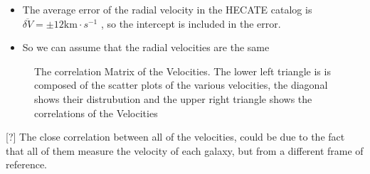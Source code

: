 \documentclass[
]{article}
\providecommand{\tightlist}{%
  \setlength{\itemsep}{0pt}\setlength{\parskip}{0pt}}\usepackage{longtable,booktabs,array}
\begin{document}
\begin{itemize}
\tightlist
\item
  The average error of the radial velocity in the HECATE catalog is
  \(\overline{\delta V} = \pm 12\text{km}\cdot s^{-1}\) , so the
  intercept is included in the error.
\item
  So we can assume that the radial velocities are the same
\end{itemize}

\begin{figure}


\caption{\label{fig-vel-pairplot}The correlation Matrix of the
Velocities. The lower left triangle is is composed of the scatter plots
of the various velocities, the diagonal shows their distrubution and the
upper right triangle shows the correlations of the Velocities}

\end{figure}%

{[}?{]} The close correlation between all of the velocities, could be
due to the fact that all of them measure the velocity of each galaxy,
but from a different frame of reference.
\end{document}
